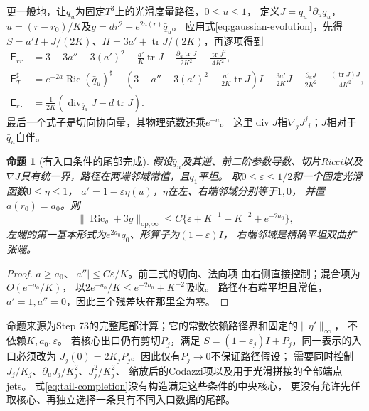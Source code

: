 \documentclass[UTF8,a4paper,11pt,fontset=fandol]{ctexart}
\numberwithin{equation}{section}
\newtheorem{proposition}[theorem]{命题}
\theoremstyle{definition}
\newcommand{\Ric}{\operatorname{Ric}}
\newcommand{\tr}{\operatorname{tr}}
\newcommand{\op}{\mathrm{op}}
\begin{document}
更一般地，让$\bar q_u$为固定$T^3$上的光滑度量路径，$0\le u\le1$，
定义$J=\bar q_u^{-1}\partial_u\bar q_u$，
$u=(r-r_0)/K$及$g=dr^2+e^{2a(r)}\bar q_u$。
应用式\eqref{eq:gaussian-evolution}，先得
$S=a'I+J/(2K)$、$H=3a'+\tr J/(2K)$，再逐项得到
\begin{align}
 \mathsf E_{rr}
 &=3-3a''-3(a')^2-\frac{a'}K\tr J
       -\frac{\partial_u\tr J}{2K^2}-\frac{\tr J^2}{4K^2},
       \label{eq:general-tail-normal}\\
 \mathsf E_T^\sharp
 &=e^{-2a}\Ric(\bar q_u)^\sharp
   +\left(3-a''-3(a')^2-\frac{a'}{2K}\tr J\right)I
   -\frac{3a'}{2K}J-\frac{\partial_uJ}{2K^2}
   -\frac{(\tr J)J}{4K^2},\label{eq:general-tail-tangent}\\
 \mathsf E_{r\cdot}
 &=\frac1{2K}\left(\operatorname{div}_{\bar q_u}J-d\tr J\right).
 \label{eq:general-tail-codazzi}
\end{align}
最后一个式子是切向协向量，其物理范数还乘$e^{-a}$。
这里$\operatorname{div}J$指$\nabla_jJ^j{}_i$；$J$相对于$\bar q_u$自伴。

\begin{proposition}[有入口条件的尾部完成]\label{prop:tail-completion}
假设$\bar q_u$及其逆、前二阶参数导数、切片Ricci以及
$\nabla J$具有统一界，路径在两端邻域常值，且$\bar q_1$平坦。
取$0\le\varepsilon\le1/2$和一个固定光滑函数$0\le\eta\le1$，
$a'=1-\varepsilon\eta(u)$，$\eta$在左、右端邻域分别等于$1,0$，
并置$a(r_0)=a_0$。则
\begin{equation}\label{eq:tail-completion}
 \|\Ric_g+3g\|_{\op,\infty}
 \le C\{\varepsilon+K^{-1}+K^{-2}+e^{-2a_0}\},
\end{equation}
左端的第一基本形式为$e^{2a_0}\bar q_0$、形算子为$(1-\varepsilon)I$，
右端邻域是精确平坦双曲扩张端。
\end{proposition}
\begin{proof}
$a\ge a_0$、$|a''|\le C\varepsilon/K$。前三式的切向、法向项
由右侧直接控制；混合项为$O(e^{-a_0}/K)$，
以$2e^{-a_0}/K\le e^{-2a_0}+K^{-2}$吸收。
路径在右端平坦且常值，$a'=1,a''=0$，因此三个残差块在那里全为零。
\end{proof}
命题来源为Step 73的完整尾部计算；它的常数依赖路径界和固定的$\|\eta'\|_\infty$，
不依赖$K,a_0,\varepsilon$。
若核心出口仍有剪切$P_j$，满足
$S=(1-\varepsilon_j)I+P_j$，同一表示的入口必须改为
$J_j(0)=2K_jP_j$。因此仅有$P_j\to0$不保证路径假设；
需要同时控制$J_j/K_j$、$\partial_uJ_j/K_j^2$、$J_j^2/K_j^2$、
缩放后的Codazzi项以及用于光滑拼接的全部端点jets。
式\eqref{eq:tail-completion}没有构造满足这些条件的中央核心，
更没有允许先任取核心、再独立选择一条具有不同入口数据的尾部。
\end{document}

